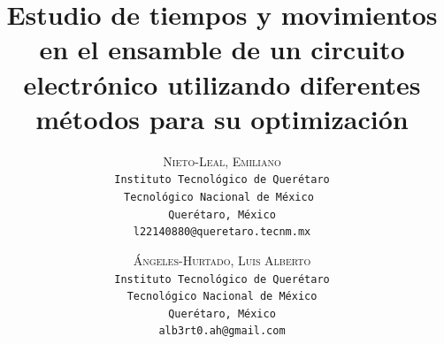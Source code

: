     \lfoot{ \thepage}
    
    \setlength{\droptitle}{-5\baselineskip} %
    \title{\textbf{Estudio de tiempos y movimientos en el ensamble de un circuito electrónico utilizando diferentes métodos para su optimización }} %
    
     \author{ 
     \textsc{Nieto-Leal, Emiliano }\\ 
     \texttt{ Instituto Tecnológico de Querétaro } \\ 
     \texttt{Tecnológico Nacional de México } \\ 
     \texttt{Querétaro, México}\\ 
     \texttt{l22140880@queretaro.tecnm.mx} 
     \and 
     \textsc{Ángeles-Hurtado, Luis Alberto}\\ 
     \texttt{ Instituto Tecnológico de Querétaro } \\ 
     \texttt{ Tecnológico Nacional de México } \\ 
     \texttt{Querétaro, México}\\ 
     \texttt{alb3rt0.ah@gmail.com} 
    }
    
